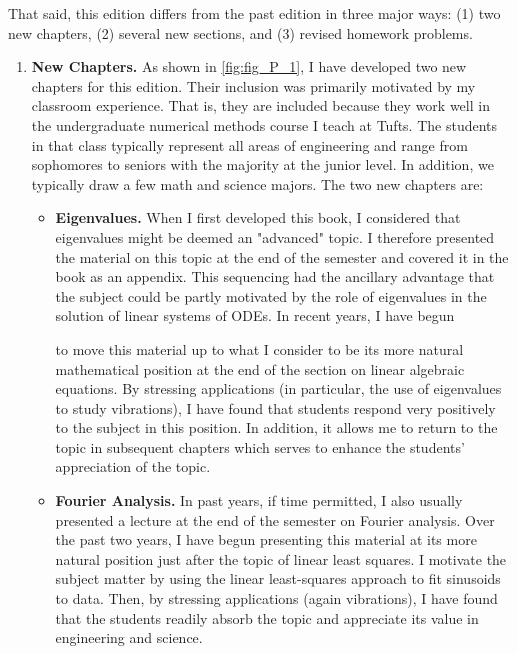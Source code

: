 \documentclass[../main.tex]{subfiles}
\begin{document}
That said, this edition differs from the past edition in three major ways: (1) two new
chapters, (2) several new sections, and (3) revised homework problems.
\begin{enumerate}
	\item  \textbf{New Chapters.} As shown in \ref{fig:fig_P_1}, I have developed two new chapters for this edition. Their inclusion was primarily motivated by my classroom experience. That is,
they are included because they work well in the undergraduate numerical methods
course I teach at Tufts. The students in that class typically represent all areas of engineering and range from sophomores to seniors with the majority at the junior level. In
addition, we typically draw a few math and science majors. The two new chapters are:
\begin{itemize}
	\item \textbf{Eigenvalues.} When I first developed this book, I considered that eigenvalues might
be deemed an "advanced" topic. I therefore presented the material on this topic at
the end of the semester and covered it in the book as an appendix. This sequencing
had the ancillary advantage that the subject could be partly motivated by the role of
eigenvalues in the solution of linear systems of ODEs. In recent years, I have begun




to move this material up to what I consider to be its more natural mathematical position at the end of the section on linear algebraic equations. By stressing applications (in particular, the use of eigenvalues to study vibrations), I have found that
students respond very positively to the subject in this position. In addition, it allows
me to return to the topic in subsequent chapters which serves to enhance the
students’ appreciation of the topic.
\item  \textbf{Fourier Analysis.} In past years, if time permitted, I also usually presented a lecture
at the end of the semester on Fourier analysis. Over the past two years, I have begun
presenting this material at its more natural position just after the topic of linear least
squares. I motivate the subject matter by using the linear least-squares approach to
fit sinusoids to data. Then, by stressing applications (again vibrations), I have found
that the students readily absorb the topic and appreciate its value in engineering and
science.



\end{itemize}
\end{enumerate}
\end{document}

